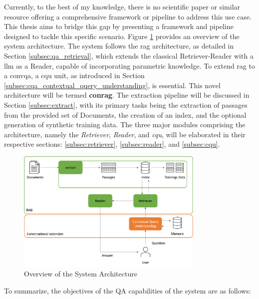 Currently, to the best of my knowledge, there is no scientific paper or similar resource offering a comprehensive framework or pipeline to address this use case. This thesis aims to bridge this gap by presenting a framework and pipeline designed to tackle this specific scenario. Figure \ref{fig:overview-system-architecture} provides an overview of the system architecture. The system follows the \gls{rag} architecture, as detailed in Section \ref{subsec:qa_retrieval}, which extends the classical Retriever-Reader with a \gls{llm} as a Reader, capable of incorporating parametric knowledge. To extend \gls{rag} to a \gls{convqa}, a \gls{cqu} unit, as introduced in Section \ref{subsec:cqa_contextual_query_understanding}, is essential. This novel architecture will be termed \textbf{\gls{conrag}}. The extraction pipeline will be discussed in Section \ref{subsec:extract}, with its primary tasks being the extraction of passages from the provided set of Documents, the creation of an index, and the optional generation of synthetic training data. The three major modules comprising the architecture, namely the \textit{Retriever}, \textit{Reader}, and \textit{\gls{cqu}}, will be elaborated in their respective sections: \ref{subsec:retriever}, \ref{subsec:reader}, and \ref{subsec:cqu}.

\begin{figure}
    \centering
    \includegraphics[width=0.8\textwidth]{Grafiken/System_Architecture.png}
    \caption{Overview of the System Architecture}
    \label{fig:overview-system-architecture}
\end{figure}

To summarize, the objectives of the QA capabilities of the system are as follows:

